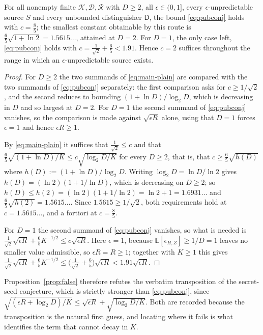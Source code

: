 \documentclass{conjura-solution}
\newcommand{\calK}{\mathcal{K}}
\newcommand{\calD}{\mathcal{D}}
\newcommand{\calR}{\mathcal{R}}
\begin{document}
\begin{corollary}\label{cor:pub}
For all nonempty finite $\calK, \calD, \calR$ with $D \ge 2$, all $\epsilon \in (0,1]$, every
$\epsilon$-unpredictable source $S$ and every unbounded distinguisher $\mathsf{D}$, the bound
\eqref{eq:pubconj} holds with $c = \tfrac85$; the smallest constant obtainable by this route is
$\tfrac65\sqrt{1 + \ln 2} = 1.5615\ldots$, attained at $D = 2$. For $D = 1$, the only case left,
\eqref{eq:pubconj} holds with $c = \tfrac{1}{\sqrt2} + \tfrac65 < 1.91$. Hence $c = 2$ suffices
throughout the range in which an $\epsilon$-unpredictable source exists.
\end{corollary}

\begin{proof}
For $D \ge 2$ the two summands of \eqref{eq:main-plain} are compared with the two summands of
\eqref{eq:pubconj} separately: the first comparison asks for $c \ge 1/\sqrt2$, and the second
reduces to bounding $(1+\ln D)/\log_2 D$, which is decreasing in $D$ and so largest at $D = 2$.
For $D = 1$ the second summand of \eqref{eq:pubconj} vanishes, so the comparison is made against
$\sqrt{\epsilon R}$ alone, using that $D = 1$ forces $\epsilon = 1$ and hence $\epsilon R \ge 1$.

By \eqref{eq:main-plain} it suffices that $\tfrac{1}{\sqrt2} \le c$ and that
$\tfrac65\sqrt{(1+\ln D)/K} \le c\sqrt{\log_2 D / K}$ for every $D \ge 2$, that is, that
$c \ge \tfrac65\sqrt{h(D)}$ where $h(D) := (1+\ln D)/\log_2 D$. Writing
$\log_2 D = \ln D/\ln 2$ gives $h(D) = (\ln 2)(1 + 1/\ln D)$, which is decreasing on $D \ge 2$;
so $h(D) \le h(2) = (\ln 2)(1 + 1/\ln 2) = \ln 2 + 1 = 1.6931\ldots$ and
$\tfrac65\sqrt{h(2)} = 1.5615\ldots$. Since $1.5615 \ge 1/\sqrt2$, both requirements hold at
$c = 1.5615\ldots$, and a fortiori at $c = \tfrac85$.

For $D = 1$ the second summand of \eqref{eq:pubconj} vanishes, so what is needed is
$\tfrac{1}{\sqrt2}\sqrt{\epsilon R} + \tfrac65 K^{-1/2} \le c\sqrt{\epsilon R}$. Here $\epsilon = 1$,
because $\mathbb{E}[\epsilon_{H,Z}] \ge 1/D = 1$ leaves no smaller value admissible, so
$\epsilon R = R \ge 1$; together with $K \ge 1$ this gives
$\tfrac{1}{\sqrt2}\sqrt{\epsilon R} + \tfrac65 K^{-1/2} \le
\bigl(\tfrac{1}{\sqrt2} + \tfrac65\bigr)\sqrt{\epsilon R} < 1.91\sqrt{\epsilon R}$.
\end{proof}

Proposition~\ref{prop:false} therefore refutes the verbatim transposition of the secret-seed
conjecture, which is strictly stronger than \eqref{eq:pubconj}, since
$\sqrt{(\epsilon R + \log_2 D)/K} \le \sqrt{\epsilon R} + \sqrt{\log_2 D/K}$. Both are recorded
because the transposition is the natural first guess, and locating where it fails is what
identifies the term that cannot decay in $K$.
\end{document}
